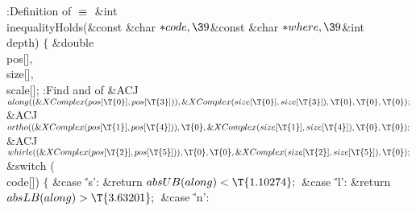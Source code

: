 \Y\B\4:Definition of \X${}\equiv{}$\6
\&{int} \\{inequalityHolds}(\&{const} \&{char} ${}{*}\\{code},\39{}$\&{const} %
\&{char} ${}{*}\\{where},\39{}$\&{int} \\{depth})\1\1\2\2\6
${}\{{}$\1\6
\&{double} \\{pos}[]${},{}$ \\{size}[]${},{}$ \\{scale}[];\7
:Find  and  of \X\7
\&{ACJ} ${}\\{along}((\&{XComplex}(\\{pos}[\T{0}],\39\\{pos}[\T{3}])),\39%
\&{XComplex}(\\{size}[\T{0}],\39\\{size}[\T{3}]),\39\T{0},\39\T{0},\39%
\T{0});{}$\6
\&{ACJ} ${}\\{ortho}((\&{XComplex}(\\{pos}[\T{1}],\39\\{pos}[\T{4}])),\39\T{0},%
\39\&{XComplex}(\\{size}[\T{1}],\39\\{size}[\T{4}]),\39\T{0},\39\T{0});{}$\6
\&{ACJ} ${}\\{whirle}((\&{XComplex}(\\{pos}[\T{2}],\39\\{pos}[\T{5}])),\39%
\T{0},\39\T{0},\39\&{XComplex}(\\{size}[\T{2}],\39\\{size}[\T{5}]),\39%
\T{0});{}$\7
\&{switch} (\\{code}[])\5
${}\{{}$\1\6
\4\&{case} \.{'s'}:\6
\&{return} ${}\\{absUB}(\\{along})<\T{1.10274};{}$\6
\4\&{case} \.{'l'}:\6
\&{return} ${}\\{absLB}(\\{along})>\T{3.63201};{}$\6
\4\&{case} \.{'n'}:\6
